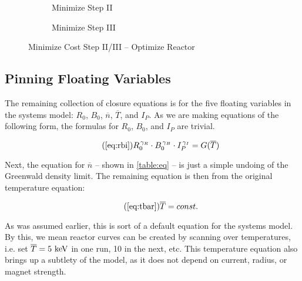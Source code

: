 \begin{figure*}
    \centering
    \begin{subfigure}[t]{0.8\textwidth}
        \centering
		\begin{adjustbox}{width=\textwidth}
			
		\end{adjustbox}
        \caption{ Minimize Step II }
    \end{subfigure} 
    \par \bigskip \par \bigskip 
    \begin{subfigure}[t]{0.8\textwidth}
        \centering
		\begin{adjustbox}{width=\textwidth}
			
		\end{adjustbox}
        \caption{ Minimize Step III }
    \end{subfigure}
    \par \bigskip \par \bigskip    
    \caption{Minimize Cost Step II/III -- Optimize Reactor}
    \label{fig:minimize} 
\end{figure*}

\subsection{Pinning Floating Variables} 

The remaining collection of closure equations is for the five floating variables in the systems model: $R_0$, $B_0$, $\overline n$, $\overline T$, and $I_P$. As we are making equations of the following form, the formulas for $R_0$, $B_0$, and $I_P$ are trivial.

\begin{equation}
	\tag{\ref{eq:rbi}}
	R_0^{\, \gamma_R} \cdot B_0^{\, \gamma_B} \cdot I_P^{\, \gamma_I} = G( \overline T )
\end{equation}

Next, the equation for $\overline n$ -- shown in \cref{table:eq} -- is just a simple undoing of the Greenwald density limit. The remaining equation is then from the original temperature equation:

\begin{equation}
	\tag{\ref{eq:tbar}}
	\overline T = const.
\end{equation}

As was assumed earlier, this is sort of a default equation for the systems model. By this, we mean reactor curves can be created by scanning over temperatures, i.e. set $\overline T = 5 \ \textnormal{keV}$ in one run, 10 in the next, etc. This temperature equation also brings up a subtlety of the model, as it does not depend on current, radius, or magnet strength.

